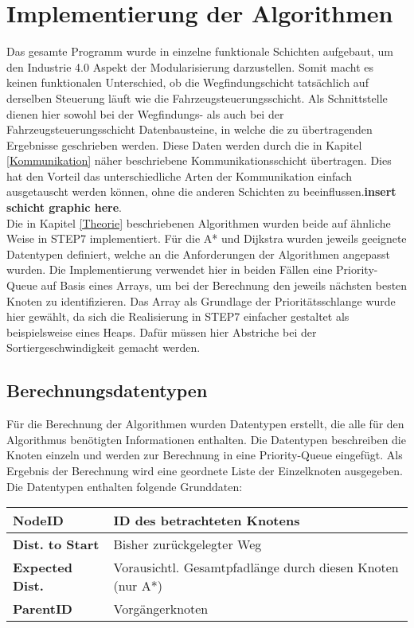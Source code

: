 	\section{Implementierung der Algorithmen}
	
		Das gesamte Programm wurde in einzelne funktionale Schichten aufgebaut, um den Industrie 4.0 Aspekt der Modularisierung darzustellen. Somit macht es keinen funktionalen Unterschied, ob die Wegfindungschicht tatsächlich auf derselben Steuerung läuft wie die Fahrzeugsteuerungsschicht. Als Schnittstelle dienen hier sowohl bei der Wegfindungs- als auch bei der Fahrzeugsteuerungsschicht  Datenbausteine, in welche die zu übertragenden Ergebnisse geschrieben werden. Diese Daten werden durch die in Kapitel \ref{Kommunikation} näher beschriebene Kommunikationsschicht übertragen. Dies hat den Vorteil das unterschiedliche Arten der Kommunikation einfach ausgetauscht werden können, ohne die anderen Schichten zu beeinflussen.\textbf{insert schicht graphic here}.\\
		
		Die in Kapitel \ref{Theorie} beschriebenen Algorithmen wurden beide auf ähnliche Weise in \ac{STEP7} implementiert. Für die A* und Dijkstra wurden jeweils geeignete Datentypen definiert, welche an die Anforderungen der Algorithmen angepasst wurden. Die Implementierung verwendet hier in beiden Fällen eine Priority-Queue auf Basis eines Arrays, um bei der Berechnung den jeweils nächsten besten Knoten zu identifizieren. Das Array als Grundlage der Prioritätsschlange wurde hier gewählt, da sich die Realisierung in \ac{STEP7} einfacher gestaltet als beispielsweise eines Heaps. Dafür müssen hier Abstriche bei der Sortiergeschwindigkeit gemacht werden.
		
		\subsection{Berechnungsdatentypen}
			
			Für die Berechnung der Algorithmen wurden Datentypen erstellt, die alle für den Algorithmus benötigten Informationen enthalten. Die Datentypen beschreiben die Knoten einzeln und werden zur Berechnung in eine Priority-Queue eingefügt. Als Ergebnis der Berechnung wird eine geordnete Liste der Einzelknoten ausgegeben. Die Datentypen enthalten folgende Grunddaten:
			
			\begin{longtable}{| l | l |}
				\hline
				\textbf{NodeID} & ID des betrachteten Knotens\\ \hline
				\textbf{Dist. to Start} & Bisher zurückgelegter Weg\\ \hline
				\textbf{Expected Dist.} & Vorausichtl. Gesamtpfadlänge durch diesen Knoten (nur A*)\\ \hline
				\textbf{ParentID} & Vorgängerknoten\\
				\hline
			\end{longtable}
			
